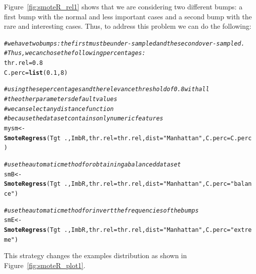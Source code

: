 \documentclass[10pt,a4paper]{article}\usepackage[]{graphicx}\usepackage[]{color}
\makeatletter
\newcommand{\hlnum}[1]{\textcolor[rgb]{0.686,0.059,0.569}{#1}}%
\newcommand{\hlstr}[1]{\textcolor[rgb]{0.192,0.494,0.8}{#1}}%
\newcommand{\hlcom}[1]{\textcolor[rgb]{0.678,0.584,0.686}{\textit{#1}}}%
\newcommand{\hlopt}[1]{\textcolor[rgb]{0,0,0}{#1}}%
\newcommand{\hlstd}[1]{\textcolor[rgb]{0.345,0.345,0.345}{#1}}%
\newcommand{\hlkwb}[1]{\textcolor[rgb]{0.69,0.353,0.396}{#1}}%
\newcommand{\hlkwc}[1]{\textcolor[rgb]{0.333,0.667,0.333}{#1}}%
\newcommand{\hlkwd}[1]{\textcolor[rgb]{0.737,0.353,0.396}{\textbf{#1}}}%
\newenvironment{kframe}{%
 \def\at@end@of@kframe{}%
 \ifinner\ifhmode%
  \def\at@end@of@kframe{\end{minipage}}%
  \begin{minipage}{\columnwidth}%
 \fi\fi%
 \def\FrameCommand##1{\hskip\@totalleftmargin \hskip-\fboxsep
 \colorbox{shadecolor}{##1}\hskip-\fboxsep
     \hskip-\linewidth \hskip-\@totalleftmargin \hskip\columnwidth}%
 \MakeFramed {\advance\hsize-\width
   \@totalleftmargin\z@ \linewidth\hsize
   \@setminipage}}%
 {\par\unskip\endMakeFramed%
 \at@end@of@kframe}
\newenvironment{knitrout}{}{} %
\makeatother
\begin{document}
Figure~\ref{fig:smoteR_rel1} shows that we are considering two different bumps: a first bump with the normal and less important cases and a second bump with the rare and interesting cases. Thus, to address this problem we can do the following:

\begin{knitrout}\footnotesize
{}\color{fgcolor}\begin{kframe}
\begin{alltt}
\hlcom{# we have two bumps: the first must be under-sampled and the second over-sampled. }
\hlcom{# Thus, we can chose the following percentages: }
\hlstd{thr.rel} \hlkwb{=} \hlnum{0.8}
\hlstd{C.perc} \hlkwb{=} \hlkwd{list}\hlstd{(}\hlnum{0.1}\hlstd{,} \hlnum{8}\hlstd{)}

\hlcom{# using these percentages and the relevance threshold of 0.8 with all}
\hlcom{# the other parameters default values}
\hlcom{# we can select any distance function }
\hlcom{# because the data set contains only numeric features}
\hlstd{mysm} \hlkwb{<-} \hlkwd{SmoteRegress}\hlstd{(Tgt}\hlopt{~}\hlstd{., ImbR,} \hlkwc{thr.rel}\hlstd{=thr.rel,} \hlkwc{dist}\hlstd{=}\hlstr{"Manhattan"}\hlstd{,} \hlkwc{C.perc}\hlstd{=C.perc)}

\hlcom{# use the automatic method for obtaining a balanced data set}
\hlstd{smB} \hlkwb{<-} \hlkwd{SmoteRegress}\hlstd{(Tgt}\hlopt{~}\hlstd{., ImbR,} \hlkwc{thr.rel}\hlstd{=thr.rel,} \hlkwc{dist}\hlstd{=}\hlstr{"Manhattan"}\hlstd{,} \hlkwc{C.perc}\hlstd{=}\hlstr{"balance"}\hlstd{)}

\hlcom{# use the automatic method for invert the frequencies of the bumps}
\hlstd{smE} \hlkwb{<-} \hlkwd{SmoteRegress}\hlstd{(Tgt}\hlopt{~}\hlstd{., ImbR,} \hlkwc{thr.rel}\hlstd{=thr.rel,} \hlkwc{dist}\hlstd{=}\hlstr{"Manhattan"}\hlstd{,} \hlkwc{C.perc}\hlstd{=}\hlstr{"extreme"}\hlstd{)}
\end{alltt}
\end{kframe}
\end{knitrout}

This strategy changes the examples distribution as shown in Figure~\ref{fig:smoteR_plot1}.
\end{document}
